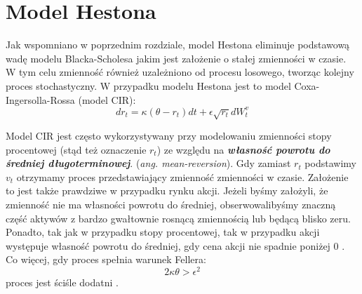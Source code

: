 \documentclass{pracamgr}
\begin{document}






\section{Model Hestona}
Jak wspomniano w poprzednim rozdziale, model Hestona eliminuje podstawową wadę modelu Blacka-Scholesa jakim jest założenie o stałej zmienności w czasie.
W tym celu zmienność również uzależniono od procesu losowego, tworząc kolejny proces stochastyczny. W przypadku modelu Hestona jest to model Coxa-Ingersolla-Rossa (model CIR):
\begin{equation}
dr_t  = \kappa (\theta  - r_t)dt + \epsilon \sqrt{r_t} dW_t^v 
\end{equation}

Model CIR jest często wykorzystywany przy modelowaniu zmienności stopy procentowej (stąd też oznaczenie $r_t$) ze względu na \textbf{\textit{własność powrotu do średniej długoterminowej}}. 
(\textit{ang. mean-reversion}). Gdy zamiast $r_t$ podstawimy $v_t$ otrzymamy proces przedstawiający zmienność zmienności w czasie. Założenie to jest także prawdziwe w przypadku rynku 
akcji. Jeżeli byśmy założyli, że zmienność nie ma własności powrotu do średniej, obserwowalibyśmy znaczną część aktywów z bardzo gwałtownie rosnącą zmiennością lub będącą blisko zeru.
Ponadto, tak jak w przypadku stopy procentowej, tak w przypadku akcji występuje własność powrotu do średniej, gdy cena akcji nie spadnie poniżej 0 \cite{TestingMeanReversion}.
Co więcej, gdy proces spełnia warunek Fellera:
\begin{equation}
2 \kappa \theta > \epsilon^2
\end{equation}
proces jest ściśle dodatni \cite{TheLittleHestonTrap}.
\end{document}
